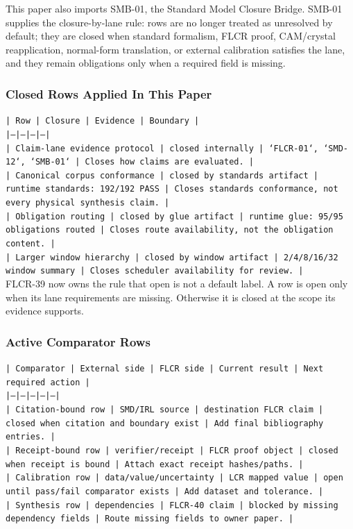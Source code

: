 \documentclass[11pt]{article}
\begin{document}
This paper also imports SMB-01, the Standard Model Closure Bridge. SMB-01 supplies the closure-by-lane rule: rows are no longer treated as unresolved by default; they are closed when standard formalism, FLCR proof, CAM/crystal reapplication, normal-form translation, or external calibration satisfies the lane, and they remain obligations only when a required field is missing.

\subsubsection*{Closed Rows Applied In This Paper}

\noindent\texttt{| Row | Closure | Evidence | Boundary |}\\
\noindent\texttt{|---|---|---|---|}\\
\noindent\texttt{| Claim-lane evidence protocol | closed internally | `FLCR-01`, `SMD-12`, `SMB-01` | Closes how claims are evaluated. |}\\
\noindent\texttt{| Canonical corpus conformance | closed by standards artifact | runtime standards: 192/192 PASS | Closes standards conformance, not every physical synthesis claim. |}\\
\noindent\texttt{| Obligation routing | closed by glue artifact | runtime glue: 95/95 obligations routed | Closes route availability, not the obligation content. |}\\
\noindent\texttt{| Larger window hierarchy | closed by window artifact | 2/4/8/16/32 window summary | Closes scheduler availability for review. |}\\

FLCR-39 now owns the rule that open is not a default label. A row is open only when its lane requirements are missing. Otherwise it is closed at the scope its evidence supports.

\subsubsection*{Active Comparator Rows}

\noindent\texttt{| Comparator | External side | FLCR side | Current result | Next required action |}\\
\noindent\texttt{|---|---|---|---|---|}\\
\noindent\texttt{| Citation-bound row | SMD/IRL source | destination FLCR claim | closed when citation and boundary exist | Add final bibliography entries. |}\\
\noindent\texttt{| Receipt-bound row | verifier/receipt | FLCR proof object | closed when receipt is bound | Attach exact receipt hashes/paths. |}\\
\noindent\texttt{| Calibration row | data/value/uncertainty | LCR mapped value | open until pass/fail comparator exists | Add dataset and tolerance. |}\\
\noindent\texttt{| Synthesis row | dependencies | FLCR-40 claim | blocked by missing dependency fields | Route missing fields to owner paper. |}\\
\end{document}
